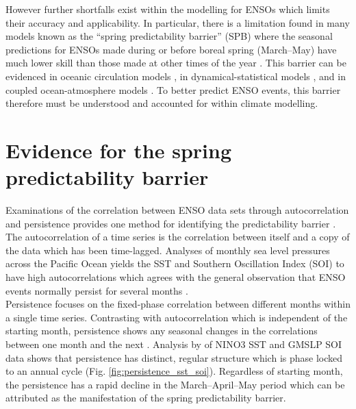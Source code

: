 \documentclass[12pt, onecolumn]{revtex4}    %
\begin{document}
However further shortfalls exist within the modelling for ENSOs which limits their accuracy and applicability. In particular, there is a limitation found in many models known as the ``spring predictability barrier'' (SPB) where the seasonal predictions for ENSOs made during or before boreal spring (March--May) have much lower skill than those made at other times of the year \citep{torrence1998annual}. This barrier can be evidenced in oceanic circulation models \citep{latif1992much}, in dynamical-statistical models \citep{balmaseda1994enso}, and in coupled ocean-atmosphere models \citep{goswami1991predictability, xue1994prediction}. To better predict ENSO events, this barrier therefore must be understood and accounted for within climate modelling.

\section{Evidence for the spring predictability barrier}

Examinations of the correlation between ENSO data sets through autocorrelation and persistence provides one method for identifying the predictability barrier \citep{torrence1998annual}. \\

The autocorrelation of a time series is the correlation between itself and a copy of the data which has been time-lagged. Analyses of monthly sea level pressures across the Pacific Ocean yields the SST and Southern Oscillation Index (SOI) to have high autocorrelations which agrees with the general observation that ENSO events normally persist for several months \citep{trenberth1976spatial}. \\

Persistence focuses on the fixed-phase correlation between different months within a single time series. Contrasting with autocorrelation which is independent of the starting month, persistence shows any seasonal changes in the correlations between one month and the next \citep{troup1965southern}. Analysis by \cite{torrence1998annual} of NINO3 SST and GMSLP SOI data shows that persistence has distinct, regular structure which is phase locked to an annual cycle (Fig. \ref{fig:persistence_sst_soi}). Regardless of starting month, the persistence has a rapid decline in the March--April--May period which can be attributed as the manifestation of the spring predictability barrier. \\
\end{document}
